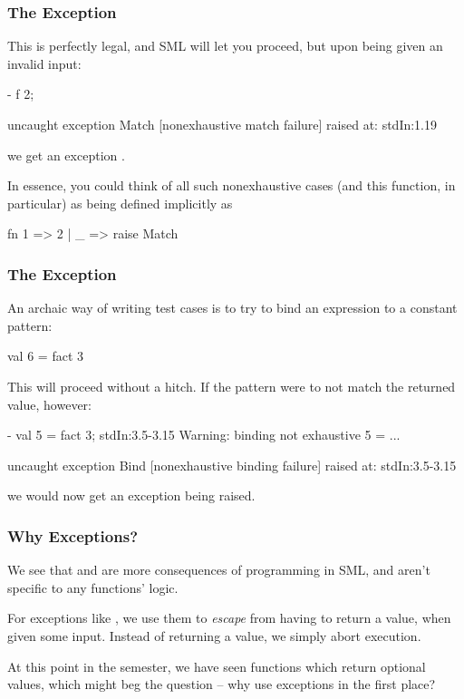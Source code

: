 \documentclass[aspectratio=169]{beamer}
\begin{document}
\begin{frame}[fragile]
  \frametitle{The  Exception}

  This is perfectly legal, and SML will let you proceed, but upon being given
  an invalid input:
  \pause
  \begin{codeblock}
    - f 2;

    uncaught exception Match [nonexhaustive match failure]
      raised at: stdIn:1.19
  \end{codeblock}
  we get an exception .

  \pause
  \vspace{\fill}

  In essence, you could think of all such nonexhaustive cases (and this function,
  in particular) as being defined implicitly as
  \pause
  \begin{codeblock}
    fn 1 => 2 | _ => raise Match
  \end{codeblock}
\end{frame}

\begin{frame}[fragile]
  \frametitle{The  Exception}

  An archaic way of writing test cases is to try to bind an expression to a
  constant pattern:
  \begin{codeblock}
    val 6 = fact 3
  \end{codeblock}

  \pause
  \vspace{\fill}

  This will proceed without a hitch. If the pattern were to not match the
  returned value, however:

  \begin{codeblock}
    - val 5 = fact 3;
    stdIn:3.5-3.15 Warning: binding not exhaustive
              5 = ...

    uncaught exception Bind [nonexhaustive binding failure]
      raised at: stdIn:3.5-3.15
  \end{codeblock}

  we would now get an exception  being raised.
\end{frame}

\begin{frame}[fragile]
  \frametitle{Why Exceptions?}

  We see that  and  are more consequences
  of programming in SML, and aren't specific to any functions' logic.

  \pause
  \vspace{\fill}

  For exceptions like , we use them to \textit{escape} from
  having to return a value, when given some input. Instead of returning
  a value, we simply abort execution.

  \pause
  \vspace{\fill}

  At this point in the semester, we have seen functions which return
  optional values, which might beg the question -- why use exceptions
  in the first place?
\end{frame}
\end{document}
